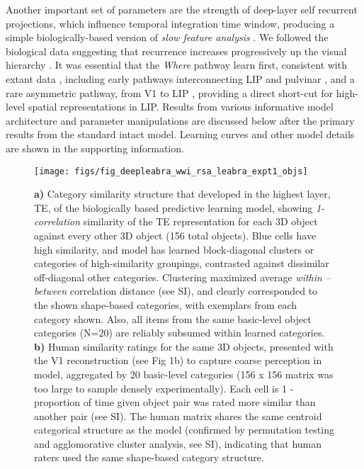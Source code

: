 \documentclass[11pt,twoside]{article}
\newif\myifpdf
\begin{document}
Another important set of parameters are the strength of deep-layer self recurrent projections, which influence temporal integration time window, producing a simple biologically-based version of \emph{slow feature analysis} \citep{WiskottSejnowski02,Foldiak91}.  We followed the biological data suggesting that recurrence increases progressively up the visual hierarchy \citep{ChaudhuriKnoblauchGarielEtAl15}.  It was essential that the \emph{Where} pathway learn first, consistent with extant data \citep{BourneRosa06,KiorpesPriceHall-HaroEtAl12}, including early pathways interconnecting LIP and pulvinar \citep{BridgeLeopoldBourne16}, and a rare asymmetric pathway, from V1 to LIP \citep{MarkovErcsey-RavaszGomesEtAl14}, providing a direct short-cut for high-level spatial representations in LIP.  Results from various informative model architecture and parameter manipulations are discussed below after the primary results from the standard intact model.  Learning curves and other model details are shown in the supporting information.

\begin{figure}
  \centering\texttt{[image: figs/fig\_deepleabra\_wwi\_rsa\_leabra\_expt1\_objs]}
  \caption{{\bf a)} Category similarity structure that developed in the highest layer, TE, of the biologically based predictive learning model, showing \emph{1-correlation} similarity of the TE representation for each 3D object against every other 3D object (156 total objects). Blue cells have high similarity, and model has learned block-diagonal clusters or categories of high-similarity groupings, contrasted against dissimilar off-diagonal other categories.  Clustering maximized average \emph{within -- between} correlation distance (see SI), and clearly corresponded to the shown shape-based categories, with exemplars from each category shown.  Also, all items from the same basic-level object categories (N=20) are reliably subsumed within learned categories. {\bf b)} Human similarity ratings for the same 3D objects, presented with the V1 reconstruction (see Fig 1b) to capture coarse perception in model, aggregated by 20 basic-level categories (156 x 156 matrix was too large to sample densely experimentally).  Each cell is 1 - proportion of time given object pair was rated more similar than another pair (see SI).  The human matrix shares the same centroid categorical structure as the model (confirmed by permutation testing and agglomorative cluster analysis, see SI), indicating that human raters used the same shape-based category structure.}
  \label{fig.rsa}
\end{figure}
\end{document}
